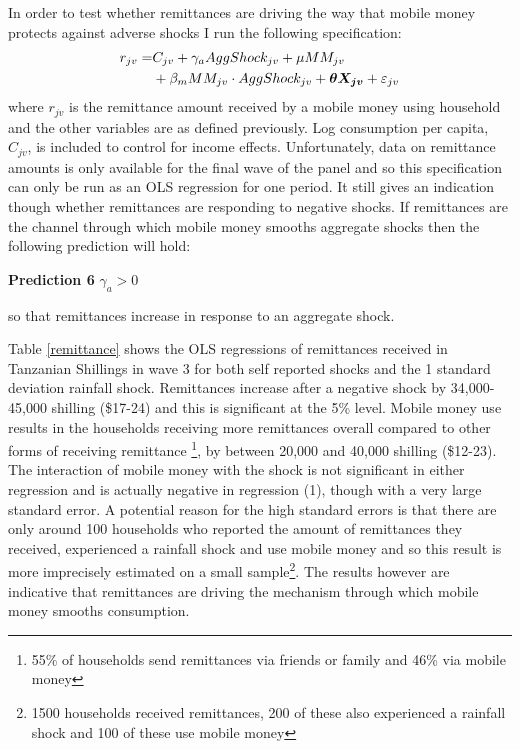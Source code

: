 In order to test whether remittances are driving the way that mobile money protects against adverse shocks I run the following specification: 
\begin{align}
r_{jv}=& C_{jv} + \gamma_a AggShock_{jv} + \mu MM_{jv} \notag \\ 
& + \beta_m MM_{jv}\cdot AggShock_{jv} + \bm{\theta X_{jv}} + \varepsilon_{jv} 
\end{align}
where $r_{jv}$ is the remittance amount received by a mobile money using household and the other variables are as defined previously. Log consumption per capita, $C_{jv}$, is included to control for income effects. Unfortunately, data on remittance amounts is only available for the final wave of the panel and so this specification can only be run as an OLS regression for one period. It still gives an indication though whether remittances are responding to negative shocks. If remittances are the channel through which mobile money smooths aggregate shocks then the following prediction will hold:
\begin{description}
\item{\bf{Prediction 6}} $\gamma_a>0$
\end{description}
so that remittances increase in response to an aggregate shock. 

Table \ref{remittance} shows the OLS regressions of remittances received in Tanzanian Shillings in wave 3 for both self reported shocks and the 1 standard deviation rainfall shock. Remittances increase after a negative shock by 34,000-45,000 shilling (\$17-24) and this is significant at the 5\% level. Mobile money use results in the households receiving more remittances overall compared to other forms of receiving remittance \footnote{55\% of households send remittances via friends or family and 46\% via mobile money}, by between 20,000 and 40,000 shilling (\$12-23). The interaction of mobile money with the shock is not significant in either regression and is actually  negative in regression (1), though with a very large standard error. A potential reason for the high standard errors is that there are only around 100 households who reported the amount of remittances they received, experienced a rainfall shock and use mobile money  and so this result is more imprecisely estimated on a small sample\footnote{1500 households received remittances, 200 of these also experienced a rainfall shock and 100 of these use mobile money}. The results however are indicative that remittances are driving the mechanism through which mobile money smooths consumption. 


